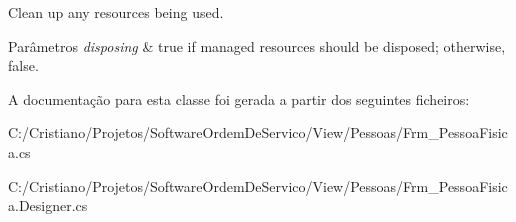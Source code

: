 Clean up any resources being used. 


\begin{DoxyParams}{Parâmetros}
{\em disposing} & true if managed resources should be disposed; otherwise, false.\\
\hline
\end{DoxyParams}


A documentação para esta classe foi gerada a partir dos seguintes ficheiros\+:\begin{DoxyCompactItemize}
\item 
C\+:/\+Cristiano/\+Projetos/\+Software\+Ordem\+De\+Servico/\+View/\+Pessoas/Frm\+\_\+\+Pessoa\+Fisica.\+cs\item 
C\+:/\+Cristiano/\+Projetos/\+Software\+Ordem\+De\+Servico/\+View/\+Pessoas/Frm\+\_\+\+Pessoa\+Fisica.\+Designer.\+cs\end{DoxyCompactItemize}
